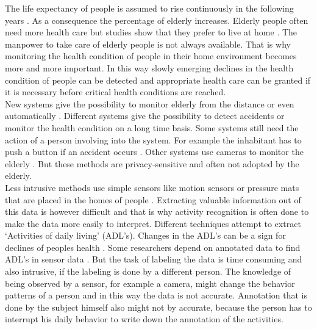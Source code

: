 % 

The life expectancy of people is assumed to rise continuously in the following years \cite{UnitedNations}. As a consequence the percentage of elderly increases. Elderly people often need more health care but studies show that they prefer to live at home \cite{Cavallo:1315167}. The manpower to take care of elderly people is not always available. That is why monitoring the health condition of people in their home environment becomes more and more important. In this way slowly emerging declines in the health condition of people can be detected and appropriate health care can be granted if it is necessary before critical health conditions are reached.\\

New systems give the possibility to monitor elderly from the distance or even automatically \cite{Tamura1998573}. Different systems give the possibility to detect accidents or monitor the health condition on a long time basis. Some systems still need the action of a person involving into the system. For example the inhabitant has to push a button if an accident occurs \cite{Kwon20125774}. Other systems use cameras to monitor the elderly \cite{Mubashir2013144,Nagai2010204}. But these methods are privacy-sensitive and often not adopted by the elderly.\\

Less intrusive methods use simple sensors like motion sensors or pressure mats that are placed in the homes of people \cite{Tapia04activityrecognition,4912776}. Extracting valuable information out of this data is however difficult and that is why activity recognition is often done to make the data more easily to interpret. Different techniques attempt to extract `Activities of daily living' (ADL's). Changes in the ADL's can be a sign for declines of peoples health \cite{Tapia04activityrecognition}.
Some researchers depend on annotated data to find ADL's in sensor data \cite{Tapia04activityrecognition,Hong2009236,Wilson:2005:STA:2154273.2154280}. But the task of labeling the data is time consuming and also intrusive, if the labeling is done by a different person. The knowledge of being observed by a sensor, for example a camera, might change the behavior patterns of a person and in this way the data is not accurate. Annotation that is done by the subject himself also might not by accurate, because the person has to interrupt his daily behavior to write down the annotation of the activities.\\

